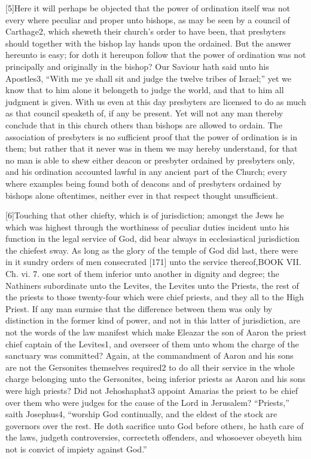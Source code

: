 [5]Here it will perhaps be objected that the power of ordination itself was not every where peculiar and proper unto bishops, as may be seen by a council of Carthage2, which sheweth their church’s order to have been, that presbyters should together with the bishop lay hands upon the ordained. But the answer hereunto is easy; for doth it hereupon follow that the power of ordination was not principally and originally in the bishop? Our Saviour hath said unto his Apostles3, “With me ye shall sit and judge the twelve tribes of Israel;” yet we know that to him alone it belongeth to judge the world, and that to him all judgment is given. With us even at this day presbyters are licensed to do as much as that council speaketh of, if any be present. Yet will not any man thereby conclude that in this church others than bishops are allowed to ordain. The association of presbyters is no sufficient proof that the power of ordination is in them; but rather that it never was in them we may hereby understand, for that no man is able to shew either deacon or presbyter ordained by presbyters only, and his ordination accounted lawful in any ancient part of the Church; every where examples being found both of deacons and of presbyters ordained by bishops alone oftentimes, neither ever in that respect thought unsufficient.

[6]Touching that other chiefty, which is of jurisdiction; amongst the Jews he which was highest through the worthiness of peculiar duties incident unto his function in the legal service of God, did bear always in ecclesiastical jurisdiction the chiefest sway. As long as the glory of the temple of God did last, there were in it sundry orders of men consecrated [171] unto the service thereof,BOOK VII. Ch. vi. 7. one sort of them inferior unto another in dignity and degree; the Nathiners subordinate unto the Levites, the Levites unto the Priests, the rest of the priests to those twenty-four which were chief priests, and they all to the High Priest. If any man surmise that the difference between them was only by distinction in the former kind of power, and not in this latter of jurisdiction, are not the words of the law manifest which make Eleazar the son of Aaron the priest chief captain of the Levites1, and overseer of them unto whom the charge of the sanctuary was committed? Again, at the commandment of Aaron and his sons are not the Gersonites themselves required2 to do all their service in the whole charge belonging unto the Gersonites, being inferior priests as Aaron and his sons were high priests? Did not Jehoshaphat3 appoint Amarias the priest to be chief over them who were judges for the cause of the Lord in Jerusalem? “Priests,” saith Josephus4, “worship God continually, and the eldest of the stock are governors over the rest. He doth sacrifice unto God before others, he hath care of the laws, judgeth controversies, correcteth offenders, and whosoever obeyeth him not is convict of impiety against God.”

